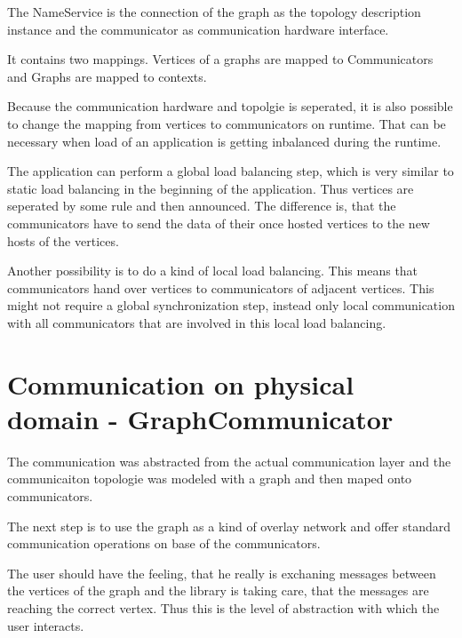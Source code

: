 The NameService is the connection of the graph as the topology
description instance and the communicator as communication hardware
interface.

It contains two mappings. Vertices of a graphs are mapped to
Communicators and Graphs are mapped to contexts.

Because the communication hardware and topolgie is seperated,
it is also possible to change the mapping from vertices to 
communicators on runtime. That can be necessary when load
of an application is getting inbalanced during the runtime.

The application can perform a global load balancing step, which
is very similar to static load balancing in the beginning
of the application. Thus vertices are seperated by some rule
and then announced. The difference is, that the communicators
have to send the data of their once hosted vertices to the
new hosts of the vertices.

Another possibility is to do a kind of local load balancing.
This means that communicators hand over vertices to communicators
of adjacent vertices. This might not require a global synchronization
step, instead only local communication with all communicators
that are involved in this local load balancing.

\section{Communication on physical domain - GraphCommunicator}
The communication was abstracted from the actual communication layer
and the communicaiton topologie was modeled with a graph and then
maped onto communicators.

The next step is to use the graph as a kind of overlay network and
offer standard communication operations on base of the communicators.

The user should have the feeling, that he really is exchaning messages
between the vertices of the graph and the library is taking care, that
the messages are reaching the correct vertex. Thus this is the level
of abstraction with which the user interacts.

